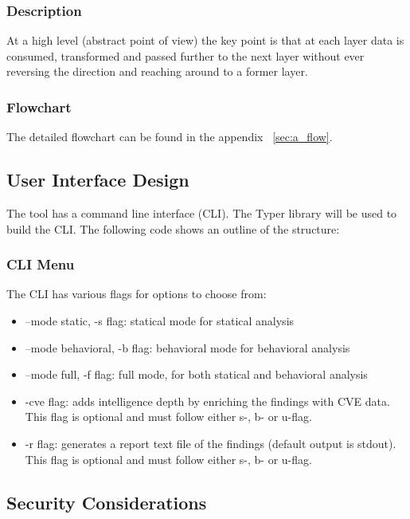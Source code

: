 \subsubsection{Description}

At a high level (abstract point of view) the key point is that at each layer data is consumed, transformed and passed further to the next layer without ever reversing the direction and reaching around to a former layer.

\subsubsection{Flowchart}

The detailed flowchart can be found in the appendix ~\ref{sec:a_flow}.

\subsection{User Interface Design}

The tool has a command line interface (CLI). The Typer library will be used to build the CLI. The following code shows an outline of the structure:

\subsubsection{CLI Menu}

The CLI has various flags for options to choose from:

\begin{itemize}
	\item --mode static, -s flag: statical mode for statical analysis
	\item --mode behavioral, -b flag: behavioral mode for behavioral analysis
	\item --mode full, -f flag: full mode, for both statical and behavioral analysis
	\item -cve flag: adds intelligence depth by enriching the findings with CVE data. This flag is optional and must follow either s-, b- or u-flag.
	\item -r flag: generates a report text file of the findings (default output is stdout). This flag is optional and must follow either s-, b- or u-flag.
\end{itemize}

\subsection{Security Considerations}

